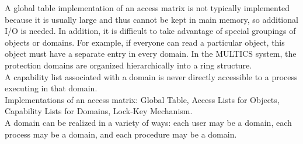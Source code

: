 \documentclass[12pt]{article}
\begin{document}
A global table implementation of an access matrix is not typically implemented because it is usually large and thus cannot be kept in main memory, so additional I/O is needed. In addition, it is difficult to take advantage of special groupings of objects or domains. For example, if everyone can read a particular object, this object must have a separate entry in every domain.
In the MULTICS system, the protection domains are organized hierarchically into a ring structure.\\[2mm]
A capability list associated with a domain is never directly accessible to a process executing in that domain.\\[2mm]
Implementations of an access matrix: Global Table, Access Lists for Objects, Capability Lists for Domains, Lock-Key Mechanism.\\[2mm]
A domain can be realized in a variety of ways: each user may be a domain, each process may be a domain, and each procedure may be a domain.
\newpage
\end{document}
